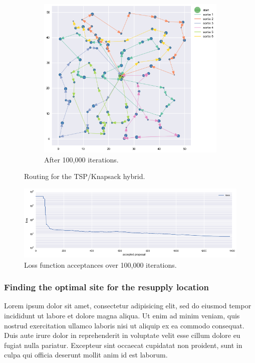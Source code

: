 \documentclass{article} %
\begin{document}
\begin{figure}
\begin{subfigure}[b]{0.5\textwidth}
  \end{subfigure}
  \begin{subfigure}[b]{\textwidth}
    \centering
    \includegraphics[width=\textwidth]{figures/sorties-100000}
    \caption{After 100,000 iterations.}
  \end{subfigure}
  \caption{Routing for the TSP/Knapsack hybrid.}
  \label{fig:sorties}
\end{figure}

\begin{figure}
	\centering
	\includegraphics[width=\textwidth]{figures/sorties-loss}
	\caption{Loss function acceptances over 100,000 iterations.}
	\label{fig:sorties-loss}
\end{figure}

\subsubsection*{Finding the optimal site for the resupply location}

Lorem ipsum dolor sit amet, consectetur adipisicing elit, sed do eiusmod tempor incididunt ut labore et dolore magna aliqua. Ut enim ad minim veniam, quis nostrud exercitation ullamco laboris nisi ut aliquip ex ea commodo consequat. Duis aute irure dolor in reprehenderit in voluptate velit esse cillum dolore eu fugiat nulla pariatur. Excepteur sint occaecat cupidatat non proident, sunt in culpa qui officia deserunt mollit anim id est laborum.
\end{document}

